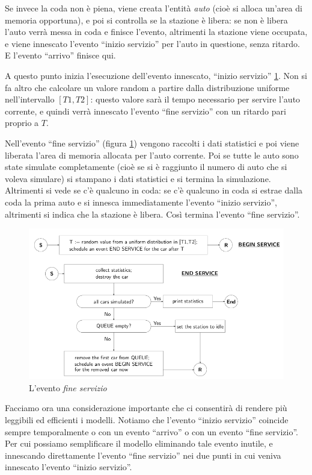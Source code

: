 \documentclass[11pt]{book}
\begin{document}
Se invece la coda non \`e piena, viene creata l'entit\`a {\em auto}
(cio\`e si alloca un'area di memoria opportuna), e poi si controlla se
la stazione \`e libera: se non \`e libera l'auto verr\`a messa in coda e
finisce l'evento, altrimenti la stazione viene occupata, e viene
innescato l'evento ``inizio servizio'' per l'auto in questione, senza
ritardo. E l'evento ``arrivo'' finisce qui.

A questo punto inizia l'esecuzione dell'evento innescato, ``inizio
servizio'' \ref{cap11fig9}. Non si fa altro che calcolare un valore
random a partire dalla distribuzione uniforme nell'intervallo
$[T1,T2]$: questo valore sar\`a il tempo necessario per servire l'auto
corrente, e quindi verr\`a innescato l'evento ``fine servizio'' con un
ritardo pari proprio a $T$.

Nell'evento ``fine servizio'' (figura \ref{cap11fig9}) vengono
raccolti i dati statistici e poi viene liberata l'area di memoria
allocata per l'auto corrente. Poi se tutte le auto sono state simulate
completamente (cio\`e se si \`e raggiunto il numero di auto che si
voleva simulare) si stampano i dati statistici e si termina la
simulazione. Altrimenti si vede se c'\`e qualcuno in coda: se c'\`e
qualcuno in coda si estrae dalla coda la prima auto e si innesca
immediatamente l'evento ``inizio servizio'', altrimenti si indica che
la stazione \`e libera. Cos\`i termina l'evento ``fine servizio''.

\begin{figure}[H]
  \centering
  \includegraphics[width=\textwidth]{images/cap11fig9.png}
  \caption{L'evento {\em fine servizio}}
  \label{cap11fig9}
\end{figure}

Facciamo ora una considerazione importante che ci consentir\`a di
rendere pi\`u leggibili ed efficienti i modelli. Notiamo che l'evento
``inizio servizio'' coincide sempre temporalmente o con un evento
``arrivo'' o con un evento ``fine servizio''. Per cui possiamo
semplificare il modello eliminando tale evento inutile, e innescando
direttamente l'evento ``fine servizio'' nei due punti in cui veniva
innescato l'evento ``inizio servizio''. 
\end{document}
